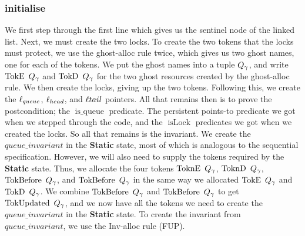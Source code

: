 \documentclass[twoside,11pt,openright]{report}
\newcommand{\isLock}{\operatorname{isLock}}
\newcommand{\isqueue}{\operatorname{is\_queue}}
\newcommand{\StaticState}{\textbf{Static}}
\newcommand{\Qgnames}{Q_\gname}
\newcommand{\TokE}[1]{\operatorname{TokE}\ #1}
\newcommand{\TokEQg}{\TokE{\Qgnames}}
\newcommand{\ToknE}[1]{\operatorname{ToknE}\ #1}
\newcommand{\ToknEQg}{\ToknE{\Qgnames}}
\newcommand{\TokD}[1]{\operatorname{TokD}\ #1}
\newcommand{\TokDQg}{\TokD{\Qgnames}}
\newcommand{\ToknD}[1]{\operatorname{ToknD}\ #1}
\newcommand{\ToknDQg}{\ToknD{\Qgnames}}
\newcommand{\TokBefore}[1]{\operatorname{TokBefore}\ #1}
\newcommand{\TokBeforeQg}{\TokBefore{\Qgnames}}
\newcommand{\TokAfterQg}{\TokBefore{\Qgnames}}
\newcommand{\TokUpdated}[1]{\operatorname{TokUpdated}\ #1}
\newcommand{\TokUpdatedQg}{\TokUpdated{\Qgnames}}
\begin{document}
\subsubsection{initialise}
We first step through the first line which gives us the sentinel node of the linked list. Next, we must create the two locks. To create the two tokens that the locks must protect, we use the ghost-alloc rule twice, which gives us two ghost names, one for each of the tokens. We put the ghost names into a tuple $\Qgnames$, and write $\TokEQg$ and $\TokDQg$ for the two ghost resources created by the ghost-alloc rule. We then create the locks, giving up the two tokens. Following this, we create the $\ell_{queue}$, $\ell_{head}$, and $\ell{tail}$ pointers. All that remains then is to prove the postcondition; the $\isqueue$ predicate. The persistent points-to predicate we got when we stepped through the code, and the $\isLock$ predicates we got when we created the locks. So all that remains is the invariant. We create the $queue\_invariant$ in the \StaticState{} state, most of which is analogous to the sequential specification. However, we will also need to supply the tokens required by the \StaticState{} state. Thus, we allocate the four tokens $\ToknEQg$, $\ToknDQg$, $\TokBeforeQg$, and $\TokAfterQg$ in the same way we allocated $\TokEQg$ and $\TokDQg$. We combine $\TokBeforeQg$ and $\TokAfterQg$ to get $\TokUpdatedQg$, and we now have all the tokens we need to create the $queue\_invariant$ in the \StaticState{} state. To create the invariant from $queue\_invariant$, we use the Inv-alloc rule (FUP).
\end{document}
